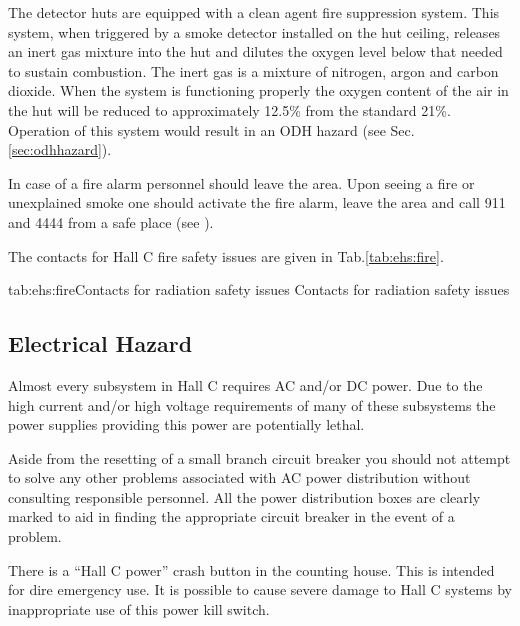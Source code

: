  The detector huts are equipped with a clean agent fire suppression system. This system, when triggered 
 by a smoke detector installed on the hut ceiling, releases an inert gas mixture into the hut and dilutes 
 the oxygen level below that needed to sustain combustion. The inert gas is a mixture of nitrogen, 
 argon and carbon dioxide. When the system is functioning properly the oxygen content of the air in the 
 hut will be reduced to approximately 12.5\% from the standard 21\%. Operation of this system
 would result in an ODH hazard (see Sec.\ref{sec:odhhazard}).

 In case of a fire alarm personnel should leave the area. Upon seeing a fire
 or unexplained smoke one should activate the fire alarm, leave the area and
 call 911 and 4444 from a safe place (see \cite{EHScebaf}).
  
 The contacts for Hall C fire safety issues are given in Tab.\ref{tab:ehs:fire}.
 
 \begin{namestab}{tab:ehs:fire}{Contacts for radiation safety issues}{%
   Contacts for radiation safety issues}
 \end{namestab}

\begin{safetyen}{0}{0}
\section{Electrical Hazard} 
\label{sec:electrhazard}
\end{safetyen}

 Almost every subsystem in Hall C requires AC and/or DC power. Due to the high current
 and/or high voltage requirements of many of these subsystems the power supplies providing this 
 power are potentially lethal.

 Aside from the resetting of a small branch circuit breaker you should not attempt to solve
 any other problems associated with AC power distribution without consulting responsible personnel. All
 the power distribution boxes are clearly marked to aid in finding the appropriate circuit breaker in
 the event of a problem.

 There is a ``Hall C power'' crash button in the counting house. This is intended for dire emergency use. 
 It is possible to cause severe damage to Hall C systems
 by inappropriate use of this power kill switch.


